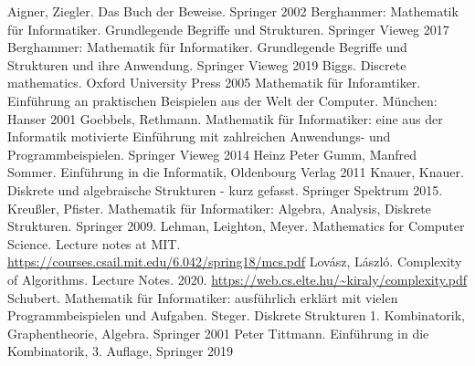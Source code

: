 \begin{thebibliography}{AAAA}
	 Aigner, Ziegler. Das Buch der Beweise. Springer 2002
	 Berghammer: Mathematik für Informatiker. Grundlegende Begriffe und Strukturen. Springer Vieweg 2017
	 Berghammer: Mathematik für Informatiker. Grundlegende Begriffe und Strukturen und ihre Anwendung. Springer Vieweg 2019
	 Biggs. Discrete mathematics. Oxford University Press 2005
	 Mathematik für Inforamtiker. Einführung an praktischen Beispielen aus der Welt der Computer. München: Hanser 2001
	 Goebbels, Rethmann. Mathematik für Informatiker: eine aus der Informatik motivierte Einführung mit zahlreichen Anwendungs- und Programmbeispielen. Springer Vieweg 2014
	 Heinz Peter Gumm, Manfred Sommer. Einführung in die Informatik, Oldenbourg Verlag 2011
	 Knauer, Knauer. Diskrete und algebraische Strukturen - kurz gefasst. Springer Spektrum 2015. 
	 Kreußler, Pfister. Mathematik für Informatiker: Algebra, Analysis, Diskrete Strukturen. Springer 2009. 
	 Lehman, Leighton, Meyer. Mathematics for Computer Science. Lecture notes at MIT. \url{https://courses.csail.mit.edu/6.042/spring18/mcs.pdf} 
	 Lov\'asz, L\'aszl\'o. Complexity of Algorithms. Lecture Notes. 2020. \url{https://web.cs.elte.hu/~kiraly/complexity.pdf} 
	 Schubert. Mathematik für Informatiker: ausführlich erklärt mit vielen Programmbeispielen und Aufgaben.  
	 Steger. Diskrete Strukturen 1. Kombinatorik, Graphentheorie, Algebra. Springer 2001
	 Peter Tittmann. Einführung in die Kombinatorik, 3. Auflage, Springer 2019
\end{thebibliography} 
